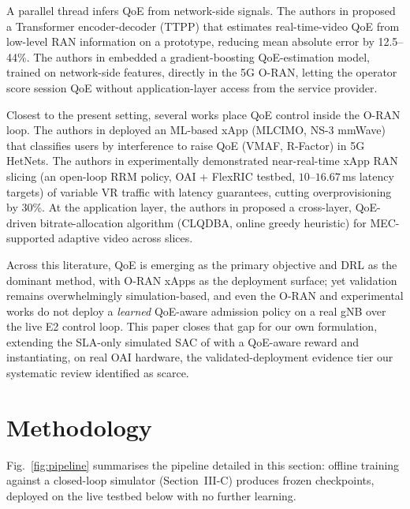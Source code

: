 \documentclass[conference]{IEEEtran}
\begin{document}
A parallel thread infers QoE from network-side signals. The authors in
\cite{sun2025qoeric} proposed a Transformer encoder-decoder (TTPP) that
estimates real-time-video QoE from low-level RAN information on a prototype,
reducing mean absolute error by 12.5--44\%. The authors in
\cite{gonzalez2025qoeoran} embedded a gradient-boosting QoE-estimation model,
trained on network-side features, directly in the 5G O-RAN, letting the
operator score session QoE without application-layer access from the service
provider.

Closest to the present setting, several works place QoE control inside the
O-RAN loop. The authors in \cite{anand2024qoexapp} deployed an ML-based xApp
(MLCIMO, NS-3 mmWave) that classifies users by interference to raise QoE
(VMAF, R-Factor) in 5G HetNets. The authors in \cite{casparsen2025vroran}
experimentally demonstrated near-real-time xApp RAN slicing (an open-loop RRM
policy, OAI + FlexRIC testbed, $10$--$16.67$\,ms latency targets) of variable
VR traffic with latency guarantees, cutting overprovisioning by 30\%. At the
application layer, the authors in \cite{yeznabad2024clqdba} proposed a
cross-layer, QoE-driven bitrate-allocation algorithm (CLQDBA, online greedy
heuristic) for MEC-supported adaptive video across slices.

Across this literature, QoE is emerging as the primary objective and DRL as the
dominant method, with O-RAN xApps as the deployment surface; yet validation
remains overwhelmingly simulation-based, and even the O-RAN and experimental
works \cite{gonzalez2025qoeoran,anand2024qoexapp,casparsen2025vroran} do not
deploy a \emph{learned} QoE-aware admission policy on a real gNB over the live
E2 control loop. This paper closes that gap for our own formulation, extending
the SLA-only simulated SAC of \cite{mecon-paper1,icraie-paper2} with a QoE-aware
reward and instantiating, on real OAI hardware, the validated-deployment
evidence tier our systematic review \cite{survey-paper3} identified as scarce.

\section{Methodology}
Fig.~\ref{fig:pipeline} summarises the pipeline detailed in this
section: offline training against a closed-loop simulator
(Section~III-C) produces frozen checkpoints, deployed on the live
testbed below with no further learning.
\end{document}
